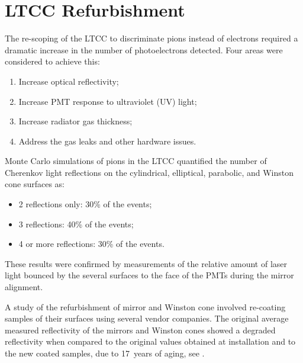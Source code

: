 \section{LTCC Refurbishment}

The re-scoping of the LTCC to discriminate pions instead of electrons required a dramatic increase in the
number of photoelectrons detected. Four areas were considered to achieve this:

\begin{enumerate}
	\item Increase optical reflectivity;
	\item Increase PMT response to ultraviolet (UV) light;
	\item Increase radiator gas thickness;
	\item Address the gas leaks and other hardware issues.
\end{enumerate}

Monte Carlo simulations of pions in the LTCC quantified the number of Cherenkov light  reflections on the cylindrical,
elliptical, parabolic, and Winston cone surfaces as:

\begin{itemize}
	\item 2 reflections only: 30\% of the events;
	\item 3 reflections: 40\% of the events;
	\item 4 or more reflections: 30\% of the events.
\end{itemize}

\noindent
These results were confirmed by measurements of the relative amount of laser light bounced by the several
surfaces to the face of the PMTs during the mirror alignment.

A study of the refurbishment of mirror and Winston cone involved re-coating samples of their
surfaces using several vendor companies. The original average measured reflectivity of the mirrors and
Winston cones showed a degraded reflectivity when compared to the original values obtained
at installation and to the new coated
samples, due to 17~years of aging, see .

